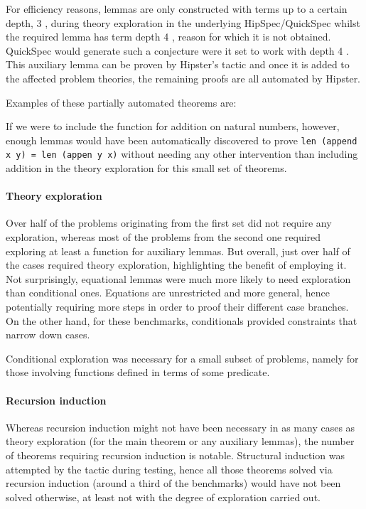 For efficiency reasons, lemmas are only constructed with terms up to a certain depth, 3
 , during theory exploration in the underlying HipSpec/QuickSpec whilst the required lemma has term depth 4
 , reason for which it is not obtained. QuickSpec would generate such a conjecture were it set to work with depth 4
 . This auxiliary lemma can be proven by Hipster's tactic and once it is added to the affected problem theories, the remaining proofs are all automated by Hipster.

Examples of these partially automated theorems are:


If we were to include the function for addition on natural numbers, however, enough lemmas would have been automatically discovered to prove \texttt{len (append x y) = len (appen y x)} without needing any other intervention than including addition in the theory exploration for this small set of theorems.

\paragraph{Theory exploration}

Over half of the problems originating from the first set did not require any exploration, whereas most of the problems from the second one required exploring at least a function for auxiliary lemmas. But overall, just over half of the cases required theory exploration, highlighting the benefit of employing it. Not surprisingly, equational lemmas were much more likely to need exploration than conditional ones. Equations are unrestricted and more general, hence potentially requiring more steps in order to proof their different case branches. On the other hand, for these benchmarks, conditionals provided constraints that narrow down cases.

Conditional exploration was necessary for a small subset of problems, namely for those involving functions defined in terms of some predicate.

\paragraph{Recursion induction}

Whereas recursion induction might not have been necessary in as many cases as theory exploration (for the main theorem or any auxiliary lemmas), the number of theorems requiring recursion induction is notable. Structural induction was attempted by the tactic during testing, hence all those theorems solved via recursion induction (around a third of the benchmarks) would have not been solved otherwise, at least not with the degree of exploration carried out.

